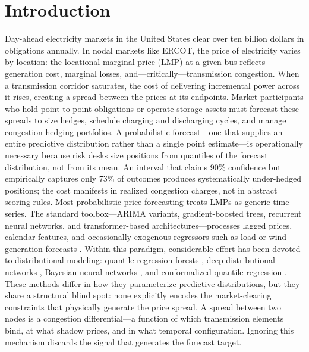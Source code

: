 \documentclass[twoside]{article}
\begin{document}
\section{Introduction}
Day-ahead electricity markets in the United States clear over ten billion dollars in obligations annually. In nodal markets like ERCOT, the price of electricity varies by location: the locational marginal price (LMP) at a given bus reflects generation cost, marginal losses, and---critically---transmission congestion. When a transmission corridor saturates, the cost of delivering incremental power across it rises, creating a spread between the prices at its endpoints. Market participants who hold point-to-point obligations or operate storage assets must forecast these spreads to size hedges, schedule charging and discharging cycles, and manage congestion-hedging portfolios. A probabilistic forecast---one that supplies an entire predictive distribution rather than a single point estimate---is operationally necessary because risk desks size positions from quantiles of the forecast distribution, not from its mean. An interval that claims 90\% confidence but empirically captures only 73\% of outcomes produces systematically under-hedged positions; the cost manifests in realized congestion charges, not in abstract scoring rules.
Most probabilistic price forecasting treats LMPs as generic time series. The standard toolbox---ARIMA variants, gradient-boosted trees, recurrent neural networks, and transformer-based architectures---processes lagged prices, calendar features, and occasionally exogenous regressors such as load or wind generation forecasts \cite{lago2020forecasting, hong2020energy}. Within this paradigm, considerable effort has been devoted to distributional modeling: quantile regression forests \cite{taieb2016forecasting}, deep distributional networks \cite{toubeau2018deep}, Bayesian neural networks \cite{brusaferri2019bayesian}, and conformalized quantile regression \cite{jonkers2024novel}. These methods differ in how they parameterize predictive distributions, but they share a structural blind spot: none explicitly encodes the market-clearing constraints that physically generate the price spread. A spread between two nodes is a congestion differential---a function of which transmission elements bind, at what shadow prices, and in what temporal configuration. Ignoring this mechanism discards the signal that generates the forecast target.
\end{document}
